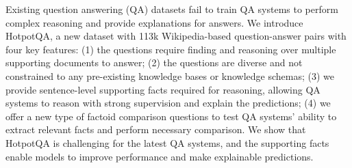 Existing question answering (QA) datasets fail to train QA systems to perform complex reasoning and provide explanations for answers. We introduce HotpotQA, a new dataset with 113k Wikipedia-based question-answer pairs with four key features: (1) the questions require finding and reasoning over multiple supporting documents to answer; (2) the questions are diverse and not constrained to any pre-existing knowledge bases or knowledge schemas; (3) we provide sentence-level supporting facts required for reasoning, allowing QA systems to reason with strong supervision and explain the predictions; (4) we offer a new type of factoid comparison questions to test QA systems' ability to extract relevant facts and perform necessary comparison. We show that HotpotQA is challenging for the latest QA systems, and the supporting facts enable models to improve performance and make explainable predictions.
